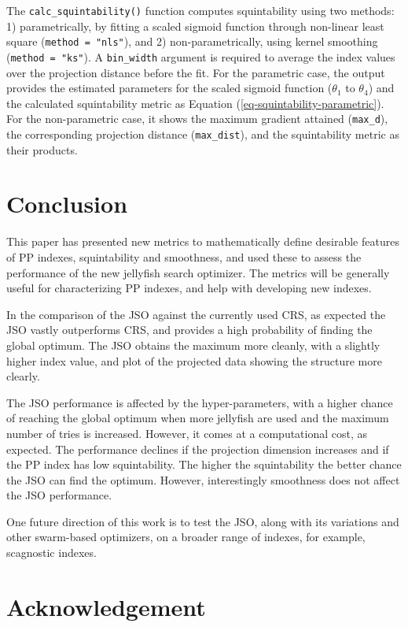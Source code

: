 \documentclass[
  12pt,
]{interact}
\theoremstyle{plain}
\begin{document}
The \texttt{calc\_squintability()} function computes squintability using
two methods: 1) parametrically, by fitting a scaled sigmoid function
through non-linear least square (\texttt{method\ =\ "nls"}), and 2)
non-parametrically, using kernel smoothing (\texttt{method\ =\ "ks"}). A
\texttt{bin\_width} argument is required to average the index values
over the projection distance before the fit. For the parametric case,
the output provides the estimated parameters for the scaled sigmoid
function (\(\theta_1\) to \(\theta_4\)) and the calculated squintability
metric as Equation (\ref{eq-squintability-parametric}). For the
non-parametric case, it shows the maximum gradient attained
(\texttt{max\_d}), the corresponding projection distance
(\texttt{max\_dist}), and the squintability metric as their products.

\section{Conclusion}\label{sec-conclusion}

This paper has presented new metrics to mathematically define desirable
features of PP indexes, squintability and smoothness, and used these to
assess the performance of the new jellyfish search optimizer. The
metrics will be generally useful for characterizing PP indexes, and help
with developing new indexes.

In the comparison of the JSO against the currently used CRS, as expected
the JSO vastly outperforms CRS, and provides a high probability of
finding the global optimum. The JSO obtains the maximum more cleanly,
with a slightly higher index value, and plot of the projected data
showing the structure more clearly.

The JSO performance is affected by the hyper-parameters, with a higher
chance of reaching the global optimum when more jellyfish are used and
the maximum number of tries is increased. However, it comes at a
computational cost, as expected. The performance declines if the
projection dimension increases and if the PP index has low
squintability. The higher the squintability the better chance the JSO
can find the optimum. However, interestingly smoothness does not affect
the JSO performance.

One future direction of this work is to test the JSO, along with its
variations and other swarm-based optimizers, on a broader range of
indexes, for example, scagnostic indexes.

\section{Acknowledgement}\label{acknowledgement}
\end{document}
